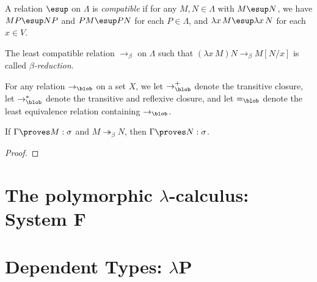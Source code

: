 \documentclass[reqno]{amsart}
\begin{document}
    \begin{definition}
        A relation $\esup$ on $\Lambda$ is \textit{compatible} if for any $M,N\in\Lambda$ with $M\esup N$, we have $MP\esup NP$ and $PM\esup PN$ for each $P\in\Lambda$, and $\lambda x\,M\esup\lambda x\,N$ for each $x\in V$.

        The least compatible relation $\rightarrow_\beta$ on $\Lambda$ such that $(\lambda x\,M)N\rightarrow_\beta M[N/x]$ is called \textit{$\beta$-reduction}.
    \end{definition}

    \begin{notation}
        For any relation $\rightarrow_\blob$ on a set $X$, we let $\rightarrow_\blob^+$ denote the transitive closure, let $\rightarrow_\blob^\ast$ denote the transitive and reflexive closure, and let $=_\blob$ denote the least equivalence relation containing $\rightarrow_\blob$.
    \end{notation}

    \begin{theorem}
        If $\Gamma\proves M:\sigma$ and $M\twoheadrightarrow_\beta N$, then $\Gamma\proves N:\sigma$.
    \end{theorem}
    \begin{proof}
        \TODO
    \end{proof}

    \section{The polymorphic $\lambda$-calculus: System $\mathbf{F}$}

    \begin{definition}
        
    \end{definition}

    \begin{lemma}
        
    \end{lemma}

    \begin{theorem}

    \end{theorem}

    \section{Dependent Types: $\lambda\mathbf{P}$}
\end{document}
